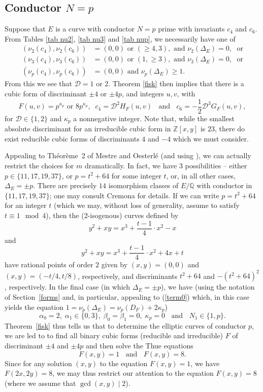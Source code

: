 \subsection{Conductor $N=p$}
Suppose that $E$ is a curve with conductor $N=p$ prime with invariants $c_4$ and $c_6$. From Tables \ref{tab nu2}, \ref{tab nu3} and \ref{tab nup}, we 
necessarily have one of 
\begin{align*}
(\nu_2 (c_4), \nu_2(c_6)) &= (0,0) \mbox{ or } (\geq 4, 3), \mbox{ and } \nu_2 (\Delta_E) = 0,  \; \mbox{ or} \\
(\nu_3 (c_4), \nu_3 (c_6)) &= (0,0) \mbox{ or } (1, \geq 3), \mbox{ and } \nu_3 (\Delta_E) = 0, \; \mbox{ or} \\
(\nu_p(c_4), \nu_p(c_6)) &= (0, 0) \mbox{ and } \nu_p(\Delta_E) \geq 1.
\end{align*}
From this we see that $\mathcal{D}= 1$ or $2$. Theorem \ref{fisk} then implies that there is a cubic form of 
discriminant $\pm 4$ or $\pm 4p$, and integers $u, v$, with
$$
F(u,v) = p^{\kappa_p} \mbox{ or } 8 p^{\kappa_p}, \; \; 
c_4 = \mathcal{D}^2 H_F(u,v)  \; \; \mbox{ and } \; \; 
c_6 = - \frac{1}{2} \mathcal{D}^3 G_F (u,v),
$$
for $\mathcal{D} \in \{1,2\}$ and $\kappa_p$ a nonnegative integer. Note that, while the smallest absolute discriminant for an irreducible cubic form in $\mathbb{Z}[x,y]$ is $23$, there do exist reducible cubic forms of discriminants $4$ and $-4$ which we must consider.

Appealing to Th\'eor\`eme~2 of Mestre and Oesterl\'e \cite{MO} (and using \cite{BCDT}), we can actually restrict the choices for $m$ dramatically. In fact, we 
have 3 possibilities --  either  $p \in \{ 11, 17, 19, 37 \}$, or $p=t^2+64$ for some integer $t$, or, in all other cases, $\Delta_E = \pm p$. There are precisely $14$ isomorphism classes of $E/\mathbb{Q}$ with conductor in $\{ 11, 17, 19, 37 \}$; one may consult Cremona \cite{Cre1} for details. If we can write $p=t^2+64$ for an integer $t$ (which we may, without loss of generality, assume to satisfy $t \equiv 1\mod{4}$),  then the ($2$-isogenous) curves defined by 
$$
 y^2 + xy = x^3 + \frac{t-1}{4} \cdot x^2  - x
$$
and
$$
 y^2 + xy = x^3 + \frac{t-1}{4} \cdot x^2 + 4x + t
$$
have  rational points of order $2$ given by $(x,y)=(0,0)$ and $(x,y) = (-t/4,t/8)$, respectively, and discriminants $t^2+64$ and  $-(t^2+64)^2$, respectively. In the 
final case (in which $\Delta_E=\pm p$), we have (using the notation of Section~\ref{forms} and, in particular, appealing to (\ref{term0}) which, in this case yields the equation $1 = \nu_p(\Delta_E) =  \nu_p (D_F) + 2 \kappa_p$)
$$
\alpha_0 =2, \;  \alpha_1 \in \{ 0, 3 \}, \;  \beta_0=\beta_1=0, \;
\kappa_p = 0 \; \; \mbox{ and } \; \;  N_1  \in \{1,p\}.
$$
Theorem~\ref{fisk} thus tells us that to determine the elliptic curves of conductor $p$, we are led to 
to find all binary cubic forms (reducible and  irreducible) $F$ of discriminant $\pm 4$ and $\pm 4p$ and then solve the 
Thue equations
$$
F(x,y) =1 \; \; \mbox{ and } \; \; F(x,y)=8.
$$
Since for any solution $(x,y)$ to the equation $F(x,y)=1$, we have $F(2x,2y)=8$, we may thus restrict our attention to the equation  $F(x,y)=8$ (where we assume that $\gcd(x,y) \mid 2$). 


